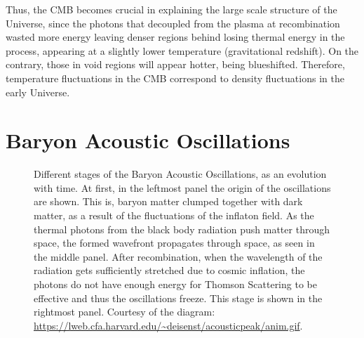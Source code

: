 Thus, the CMB becomes crucial in explaining the large scale structure of the Universe, since the photons that decoupled from the plasma at recombination wasted more energy leaving denser regions behind losing thermal energy in the process, appearing at a slightly lower temperature (gravitational redshift). On the contrary, those in void regions will appear hotter, being blueshifted. Therefore, temperature fluctuations in the CMB correspond to density fluctuations in the early Universe. \\

\section{Baryon Acoustic Oscillations}
\label{sec:BAO}

\begin{figure}[t]
	\centering
	\caption[Different time evolution stages of the Baryon Acoustic Oscillations.]{Different stages of the Baryon Acoustic Oscillations, as an evolution with time. At first, in the leftmost panel the origin of the oscillations are shown. This is, baryon matter clumped together with dark matter, as a result of the fluctuations of the inflaton field. As the thermal photons from the black body radiation push matter through space, the formed wavefront propagates through space, as seen in the middle panel. After recombination, when the wavelength of the radiation gets sufficiently stretched due to cosmic inflation, the photons do not have enough energy for Thomson Scattering to be effective and thus the oscillations freeze. This stage is shown in the rightmost panel.   Courtesy of the diagram: \url{https://lweb.cfa.harvard.edu/~deisenst/acousticpeak/anim.gif}.}
	\label{fig:scheme-BAO}
\end{figure}

